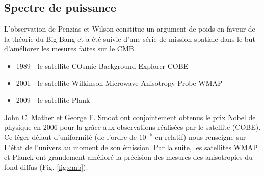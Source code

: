 \subsection{Spectre de puissance}


L'observation de Penzias et Wilson constitue un argument de poids en faveur de la théorie du Big Bang et a été suivie d'une série de mission spatiale dans le but d'améliorer les mesures faites sur le CMB.

\begin{itemize}
\item 1989 - le satellite COsmic Background Explorer COBE 
\item 2001 - le satellite Wilkinson Microwave Anisotropy Probe WMAP
\item 2009 - le satellite Plank
\end{itemize}

John C. Mather et George F. Smoot ont conjointement obtenus le prix Nobel de physique en 2006 pour la \cite{CMBanisotropiesNobel} grâce aux observations réalisées par le satellite  (COBE).
Ce léger défaut d'uniformité (de l'ordre de $10^{-5}$ en relatif) nous renseigne sur L’état de l'univers au moment de son émission.
Par la suite, les satellites WMAP et Planck ont grandement amélioré la précision des mesures des anisotropies du fond diffus (Fig. \ref{fig:cmb}).

